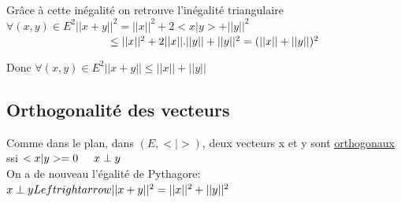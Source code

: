 \documentclass{article}
\newcommand\tab[1][1cm]{\hspace*{#1}}
\begin{document}
Grâce à cette inégalité on retrouve l'inégalité triangulaire \\
$\forall(x,y) \in E^2 ||x + y||^2 = ||x||^2 + 2<x|y> + ||y||^2$ \\
$\tab[3.3cm] \leq ||x||^2 + 2||x||.||y|| + ||y||^2 = (||x|| + ||y||)^2$

Donc $\forall(x, y) \in E^2 ||x + y|| \leq ||x|| + ||y||$

\subsection{Orthogonalité des vecteurs}

Comme dans le plan, dans $(E, <|>)$, deux vecteurs x et y sont \underline{orthogonaux} ssi $<x|y> = 0 \tab[0.5cm] x \perp y$ \\
On a de nouveau l'égalité de Pythagore: \\
$x \perp y \\Leftrightarrow ||x + y||^2 = ||x||^2 + ||y||^2$
\end{document}

